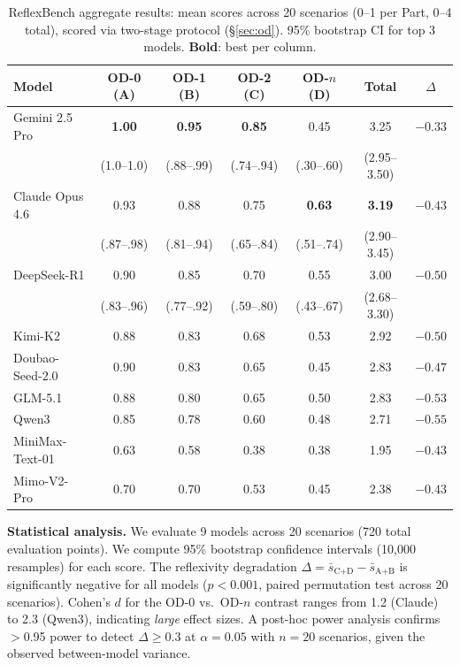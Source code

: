 \documentclass{article}
\begin{document}
\begin{table}[h]
\centering
\caption{ReflexBench aggregate results: mean scores across 20 scenarios (0--1 per Part, 0--4 total), scored via two-stage protocol (\S\ref{sec:od}). 95\% bootstrap CI for top 3 models. \textbf{Bold}: best per column.}
\label{tab:results}
\begin{tabular}{@{}lcccccc@{}}
\toprule
\textbf{Model} & \textbf{OD-0 (A)} & \textbf{OD-1 (B)} & \textbf{OD-2 (C)} & \textbf{OD-$n$ (D)} & \textbf{Total} & \textbf{$\Delta$} \\
\midrule
Gemini 2.5 Pro & \textbf{1.00} & \textbf{0.95} & \textbf{0.85} & 0.45 & 3.25 & $-0.33$ \\
 & {\tiny(1.0--1.0)} & {\tiny(.88--.99)} & {\tiny(.74--.94)} & {\tiny(.30--.60)} & {\tiny(2.95--3.50)} & \\
Claude Opus 4.6 & 0.93 & 0.88 & 0.75 & \textbf{0.63} & \textbf{3.19} & $-0.43$ \\
 & {\tiny(.87--.98)} & {\tiny(.81--.94)} & {\tiny(.65--.84)} & {\tiny(.51--.74)} & {\tiny(2.90--3.45)} & \\
DeepSeek-R1 & 0.90 & 0.85 & 0.70 & 0.55 & 3.00 & $-0.50$ \\
 & {\tiny(.83--.96)} & {\tiny(.77--.92)} & {\tiny(.59--.80)} & {\tiny(.43--.67)} & {\tiny(2.68--3.30)} & \\
Kimi-K2 & 0.88 & 0.83 & 0.68 & 0.53 & 2.92 & $-0.50$ \\
Doubao-Seed-2.0 & 0.90 & 0.83 & 0.65 & 0.45 & 2.83 & $-0.47$ \\
GLM-5.1 & 0.88 & 0.80 & 0.65 & 0.50 & 2.83 & $-0.53$ \\
Qwen3 & 0.85 & 0.78 & 0.60 & 0.48 & 2.71 & $-0.55$ \\
\midrule
MiniMax-Text-01 & 0.63 & 0.58 & 0.38 & 0.38 & 1.95 & $-0.43$ \\
Mimo-V2-Pro & 0.70 & 0.70 & 0.53 & 0.45 & 2.38 & $-0.43$ \\
\bottomrule
\end{tabular}
\end{table}

\textbf{Statistical analysis.} We evaluate 9 models across 20 scenarios (720 total evaluation points). We compute 95\% bootstrap confidence intervals (10{,}000 resamples) for each score. The reflexivity degradation $\Delta = \bar{s}_{\text{C+D}} - \bar{s}_{\text{A+B}}$ is significantly negative for all models ($p < 0.001$, paired permutation test across 20 scenarios). Cohen's $d$ for the OD-0 vs.\ OD-$n$ contrast ranges from 1.2 (Claude) to 2.3 (Qwen3), indicating \textit{large} effect sizes. A post-hoc power analysis confirms $>$0.95 power to detect $\Delta \geq 0.3$ at $\alpha = 0.05$ with $n = 20$ scenarios, given the observed between-model variance.
\end{document}
